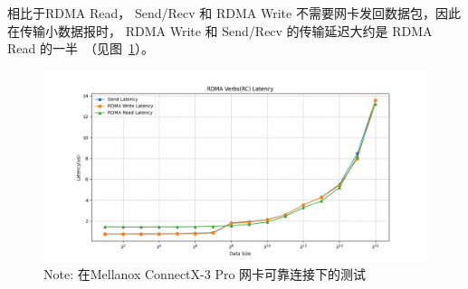 {    相比于RDMA Read， Send/Recv 和 RDMA Write 不需要网卡发回数据包，因此在传输小数据报时，
    RDMA Write 和 Send/Recv 的传输延迟大约是 RDMA Read 的一半~\citep{kalia2014herd}（见图~\ref{fig:RDMA-Verbs-Latency}）。
    \begin{figure}[!htbp]
        \centering
        \includegraphics[width=\linewidth]{Img/verbs-latency.png}
        {\small Note: 在Mellanox ConnectX-3 Pro 网卡可靠连接下的测试}
        \label{fig:RDMA-Verbs-Latency}
    \end{figure}

}
